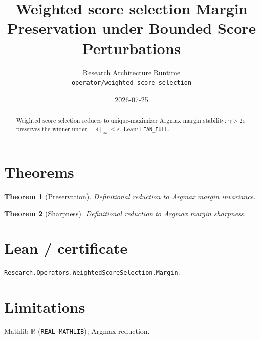 \documentclass[11pt]{article}
\title{Weighted score selection Margin Preservation under Bounded Score Perturbations}
\author{Research Architecture Runtime \\ \texttt{operator/weighted-score-selection}}
\date{2026-07-25}
\newtheorem{theorem}{Theorem}
\begin{document}
\maketitle
\begin{abstract}
Weighted score selection reduces to unique-maximizer Argmax margin stability: $\gamma>2\varepsilon$
preserves the winner under $\|\delta\|_\infty\le\varepsilon$. Lean: \texttt{LEAN\_FULL}.
\end{abstract}
\section{Theorems}
\begin{theorem}[Preservation]
Definitional reduction to Argmax margin invariance.
\end{theorem}
\begin{theorem}[Sharpness]
Definitional reduction to Argmax margin sharpness.
\end{theorem}
\section{Lean / certificate}
\texttt{Research.Operators.WeightedScoreSelection.Margin}.
\section{Limitations}
Mathlib $\mathbb{R}$ (\texttt{REAL\_MATHLIB}); Argmax reduction.
\end{document}

